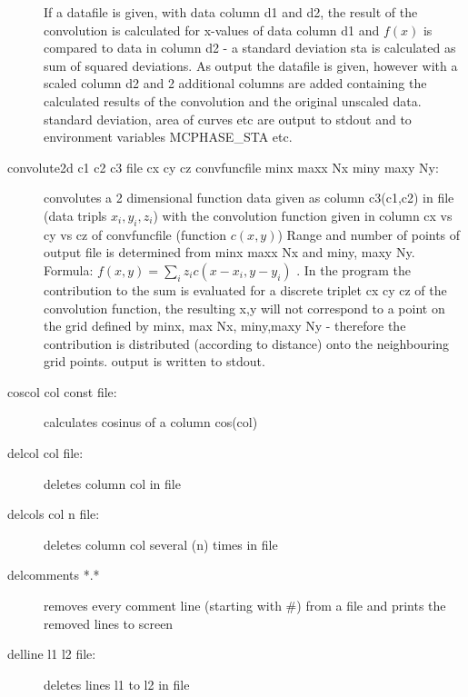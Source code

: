 \begin{description}
                       If a datafile is given, 
		     with data column d1 and d2, the result of the convolution is
		     calculated for x-values of data column d1 and $f(x)$ is compared to
		     data in column d2 - a standard deviation sta is calculated as
		     sum of squared deviations. As output the datafile is given, however with a scaled column
                 d2 and 2 additional columns are added containing the calculated
                 results of the convolution and the original unscaled data.
                 standard deviation, area of curves etc are output to
                 stdout and to environment variables MCPHASE\_STA etc.

                       
\item [\prg convolute2d\index{convolute2d} c1 c2 c3 file cx cy cz convfuncfile minx maxx Nx miny maxy Ny:] 
convolutes a 2 dimensional function data given as column c3(c1,c2) in file (data tripls $x_i,y_i, z_i$) with the convolution function given in column cx vs cy vs cz
		        of convfuncfile (function $c(x,y)$)
		       Range and number of points of output file is determined from minx maxx Nx and 
                        miny, maxy Ny.
			Formula: $f(x,y)=\sum_i z_i c(x-x_i,y-y_i)$ . In the program the contribution to
                        the sum is evaluated for a discrete triplet cx cy cz of the convolution function, the 
                        resulting x,y will not correspond to a point on the grid defined by minx, max Nx, miny,maxy Ny -
                        therefore the contribution is distributed (according to distance) onto the neighbouring grid
                       points.
		       output is written to stdout. 
\item [\prg coscol\index{coscol} col const file:] calculates cosinus of a column cos(col) 
\item [\prg delcol\index{delcol} col file:] deletes column col in file
\item [\prg delcols\index{delcols} col n file:] deletes column col several (n) times in file
\item [\prg delcomments *.*] removes every comment line (starting with \#) from a file and %
prints the removed lines to screen
\item [\prg delline\index{delline} l1 l2 file:] deletes lines l1 to l2  in file

\end{description}
